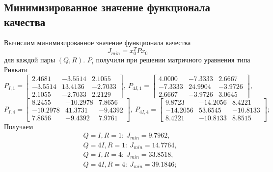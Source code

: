 \documentclass[a4paper, 12pt]{article}
\begin{document}
    \subsection{Минимизированное значение функционала качества}
    Вычислим минимизированное значение функционала качества
    $$
    J_{min}=x_0^TPx_0
    $$
    для каждой пары $\left( Q,R \right)$. $P_i$ получили при решении
    матричного уравнения типа Риккати
    $$
    P_{I,1}=\begin{bmatrix}
        2.4681   &-3.5514    &2.1055\\
        -3.5514   &13.4136   &-2.7033\\
         2.1055   &-2.7033    &2.2129   
    \end{bmatrix},\ P_{4I,1}=\begin{bmatrix}
        4.0000   &-7.3333   & 2.6667\\
   -7.3333   &24.9904   &-3.9726\\
    2.6667   &-3.9726    &3.0645
    \end{bmatrix},
    $$
    $$
    P_{I,4}=\begin{bmatrix}
        8.2455  &-10.2978    &7.8656\\
  -10.2978   &41.3731   &-9.4392\\
    7.8656   &-9.4392    &7.9761   
    \end{bmatrix},\ P_{4I,4}=\begin{bmatrix}
        9.8723  &-14.2056    &8.4221\\
  -14.2056   &53.6545  &-10.8133\\
    8.4221  &-10.8133    &8.8515
    \end{bmatrix};
    $$
    Получаем
    \begin{align*}
        &Q=I,R=1:\ J_{min}=9.7962,\\
        &Q=4I,R=1:\ J_{min}=14.7764,\\
        &Q=I,R=4:\ J_{min}=33.8518,\\
        &Q=4I,R=4:\ J_{min}=39.1846;
    \end{align*}
\end{document}
